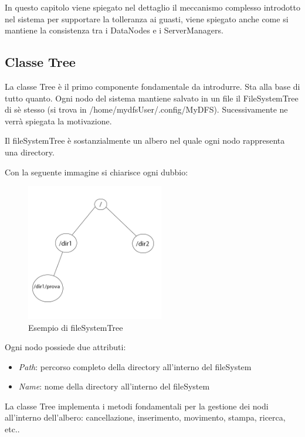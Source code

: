 \documentclass[]{article}
\begin{document}
In questo capitolo viene spiegato nel dettaglio il meccanismo complesso introdotto nel sistema per supportare la tolleranza ai guasti, viene spiegato anche come si mantiene la consistenza tra i DataNodes e i ServerManagers.

\subsection{Classe Tree}

La classe Tree è il primo componente fondamentale da introdurre. Sta alla base di tutto quanto. Ogni nodo del sistema mantiene salvato in un file il FileSystemTree di sè stesso (si trova in /home/mydfsUser/.config/MyDFS). Sucessivamente ne verrà spiegata la motivazione.

Il fileSystemTree è sostanzialmente un albero nel quale ogni nodo rappresenta una directory.
\vspace{0.2cm}

Con la seguente immagine si chiarisce ogni dubbio:

\begin{figure}[h]
	\centering
	\includegraphics[width=6cm]{../Img/fileSystemTree.png}
	\caption[]{Esempio di fileSystemTree}
	\label{fig:fileSystemTree}
	
\end{figure}

Ogni nodo possiede due attributi:

\begin{itemize}
	\item \textit{Path}: percorso completo della directory all'interno del fileSystem
	\item \textit{Name}: nome della directory all'interno del fileSystem
\end{itemize}


La classe Tree implementa i metodi fondamentali per la gestione dei nodi all'interno dell'albero: cancellazione, inserimento, movimento, stampa, ricerca, etc..
\end{document}
